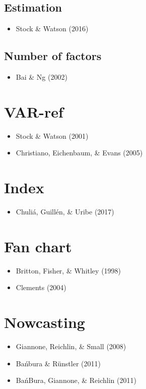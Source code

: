 \documentclass[12pt,twoside]{reedthesis}
\providecommand{\tightlist}{%
  \setlength{\itemsep}{0pt}\setlength{\parskip}{0pt}}
\begin{document}
\hypertarget{estimation}{%
\subsection{Estimation}\label{estimation}}
\begin{itemize}
\tightlist
\item
  Stock \& Watson (2016)
\end{itemize}
\hypertarget{number-of-factors}{%
\subsection{Number of factors}\label{number-of-factors}}
\begin{itemize}
\tightlist
\item
  Bai \& Ng (2002)
\end{itemize}
\hypertarget{var-ref}{%
\section{VAR-ref}\label{var-ref}}
\begin{itemize}
\tightlist
\item
  Stock \& Watson (2001)
\item
  Christiano, Eichenbaum, \& Evans (2005)
\end{itemize}
\hypertarget{index}{%
\section{Index}\label{index}}
\begin{itemize}
\tightlist
\item
  Chuliá, Guillén, \& Uribe (2017)
\end{itemize}
\hypertarget{fan-chart}{%
\section{Fan chart}\label{fan-chart}}
\begin{itemize}
\tightlist
\item
  Britton, Fisher, \& Whitley (1998)
\item
  Clements (2004)
\end{itemize}
\hypertarget{nowcasting}{%
\section{Nowcasting}\label{nowcasting}}
\begin{itemize}
\tightlist
\item
  Giannone, Reichlin, \& Small (2008)
\item
  Bańbura \& Rünstler (2011)
\item
  BańBura, Giannone, \& Reichlin (2011)
\end{itemize}
\end{document}
